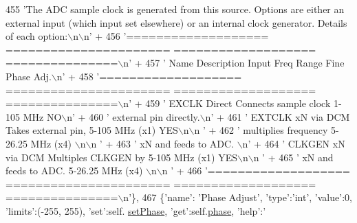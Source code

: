\begin{DoxyCode}
{{{455                                 \textcolor{stringliteral}{'The ADC sample clock is generated from this source. Options are either an
       external input (which input set elsewhere) or an internal clock generator. Details of each option:\(\backslash\)n\(\backslash\)n'} +
456                                 \textcolor{stringliteral}{'=================== ====================== ===================
       ===============\(\backslash\)n'} +
457                                 \textcolor{stringliteral}{' Name                Description            Input Freq Range   Fine Phase
       Adj.\(\backslash\)n'} +
458                                 \textcolor{stringliteral}{'=================== ====================== ===================
       ===============\(\backslash\)n'} +
459                                 \textcolor{stringliteral}{' EXCLK Direct       Connects sample clock     1-105 MHz            NO\(\backslash\)n'} +
460                                 \textcolor{stringliteral}{'                    external pin directly.\(\backslash\)n'} +
461                                 \textcolor{stringliteral}{' EXTCLK xN via DCM  Takes external pin,       5-105 MHz (x1)       YES\(\backslash\)n\(\backslash\)n
      '} +
462                                 \textcolor{stringliteral}{'                    multiplies frequency      5-26.25 MHz (x4)        \(\backslash\)n\(\backslash\)n
      '} +
463                                 \textcolor{stringliteral}{'                    xN and feeds to ADC.  \(\backslash\)n'} + 
464                                 \textcolor{stringliteral}{' CLKGEN xN via DCM  Multiples CLKGEN by       5-105 MHz (x1)       YES\(\backslash\)n\(\backslash\)n
      '} +
465                                 \textcolor{stringliteral}{'                    xN and feeds to ADC.      5-26.25 MHz (x4)        \(\backslash\)n\(\backslash\)n
      '} +
466                                 \textcolor{stringliteral}{'=================== ====================== ===================
       ===============\(\backslash\)n'}\},
467                 \{\textcolor{stringliteral}{'name'}: \textcolor{stringliteral}{'Phase Adjust'}, \textcolor{stringliteral}{'type'}:\textcolor{stringliteral}{'int'}, \textcolor{stringliteral}{'value'}:0, \textcolor{stringliteral}{'limits'}:(-255, 255), \textcolor{stringliteral}{'set'}:self.
      \hyperlink{classsoftware_1_1chipwhisperer_1_1capture_1_1scopes_1_1__OpenADCInterface_1_1ClockSettings_a119e3fafa5910e7d109aa1ff7f47b743}{setPhase}, \textcolor{stringliteral}{'get'}:self.\hyperlink{classsoftware_1_1chipwhisperer_1_1capture_1_1scopes_1_1__OpenADCInterface_1_1ClockSettings_a85835f5e4a07975f0ebace963767ca68}{phase}, \textcolor{stringliteral}{'help'}:\textcolor{stringliteral}{'%
}}}}
\end{DoxyCode}
